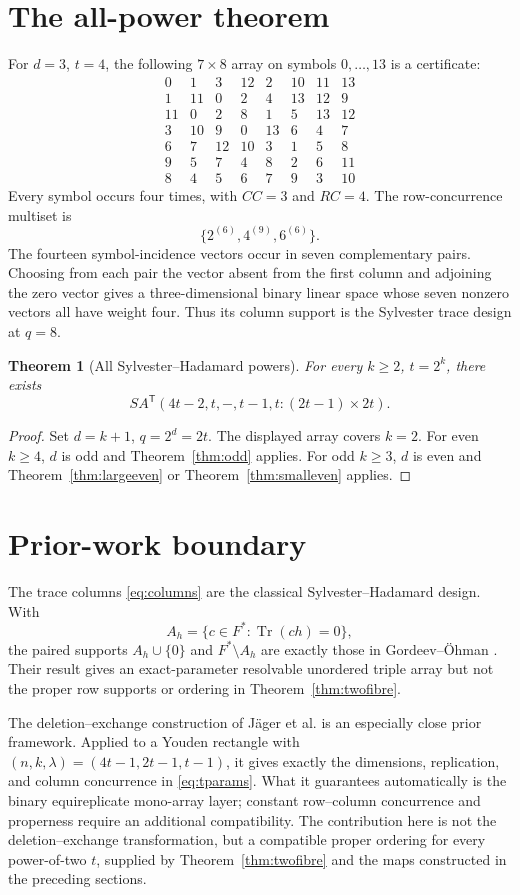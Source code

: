 \documentclass[11pt]{article}
\newtheorem{theorem}{Theorem}[section]
\theoremstyle{definition}\newtheorem{definition}[theorem]{Definition}
\theoremstyle{remark}\newtheorem{remark}[theorem]{Remark}
\DeclareMathOperator{\Tr}{Tr}
\newcommand{\SA}{SA^{\mathsf T}}
\begin{document}
\section{The all-power theorem}
For \(d=3\), \(t=4\), the following \(7\times8\) array on symbols
\(0,\ldots,13\) is a certificate:
\[
\begin{array}{rrrrrrrr}
0&1&3&12&2&10&11&13\\
1&11&0&2&4&13&12&9\\
11&0&2&8&1&5&13&12\\
3&10&9&0&13&6&4&7\\
6&7&12&10&3&1&5&8\\
9&5&7&4&8&2&6&11\\
8&4&5&6&7&9&3&10
\end{array}
\]
Every symbol occurs four times, with \(CC=3\) and \(RC=4\).  The
row-concurrence multiset is
\[
 \{2^{(6)},4^{(9)},6^{(6)}\}.
\]
The fourteen symbol-incidence vectors occur in seven complementary pairs.
Choosing from each pair the vector absent from the first column and adjoining
the zero vector gives a three-dimensional binary linear space whose seven
nonzero vectors all have weight four.  Thus its column support is the
Sylvester trace design at \(q=8\).

\begin{theorem}[All Sylvester--Hadamard powers]
\label{thm:main}
For every \(k\geq2\), \(t=2^k\), there exists
\[
 \SA(4t-2,t,-,t-1,t:(2t-1)\times2t).
\]
\end{theorem}
\begin{proof}
Set \(d=k+1\), \(q=2^d=2t\).  The displayed array covers \(k=2\).
For even \(k\geq4\), \(d\) is odd and Theorem~\ref{thm:odd} applies.
For odd \(k\geq3\), \(d\) is even and Theorem~\ref{thm:largeeven} or
Theorem~\ref{thm:smalleven} applies.
\end{proof}

\section{Prior-work boundary}
The trace columns \eqref{eq:columns} are the classical Sylvester--Hadamard
design.  With
\[
 A_h=\{c\in F^*:\Tr(ch)=0\},
\]
the paired supports \(A_h\cup\{0\}\) and \(F^*\setminus A_h\) are exactly
those in Gordeev--Öhman \cite[Theorem~5.13]{gordeev-ohman}.  Their result
gives an exact-parameter resolvable unordered triple array but not the proper
row supports or ordering in Theorem~\ref{thm:twofibre}.

The deletion--exchange construction of J\"ager et al.
\cite[Construction~5.2 and Theorem~5.3]{jager-youden} is an especially close
prior framework.  Applied to a Youden rectangle with
\((n,k,\lambda)=(4t-1,2t-1,t-1)\), it gives exactly the dimensions,
replication, and column concurrence in \eqref{eq:tparams}.  What it guarantees
automatically is the binary equireplicate mono-array layer; constant
row--column concurrence and properness require an additional compatibility.
The contribution here is not the deletion--exchange transformation, but a
compatible proper ordering for every power-of-two \(t\), supplied by
Theorem~\ref{thm:twofibre} and the maps constructed in the preceding sections.
\end{document}
